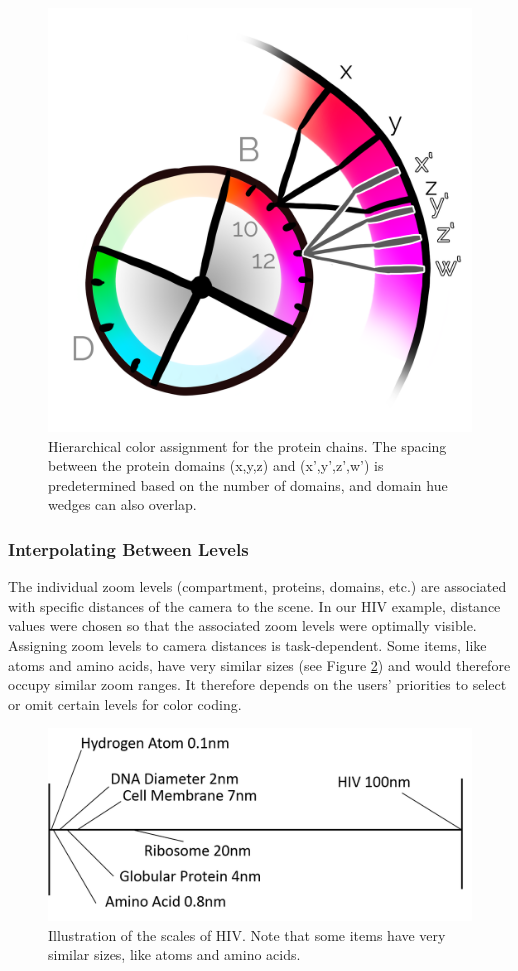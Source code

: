 \documentclass{egpubl}
\begin{document}
	
	\begin{figure}
		\centering
		\includegraphics[width=0.4\linewidth]{Figures/overlap}
		\caption{Hierarchical color assignment for the protein chains. 
			The spacing between the protein domains (x,y,z) and (x',y',z',w') is predetermined based on the number of domains, and domain hue wedges can also overlap. 
		}
		\label{fig:overlap}
	\end{figure}
	
	

	
	\subsubsection{Interpolating Between Levels}
	
	The individual zoom levels (compartment, proteins, domains, etc.) are associated with specific distances of the camera to the scene. 
	In our HIV example, distance values were chosen so that the associated zoom levels were optimally visible. 
	Assigning zoom levels to camera distances is task-dependent. 
	Some items, like atoms and amino acids, have very similar sizes (see Figure \ref{fig:hivScale}) and would therefore occupy similar zoom ranges. 
	It therefore depends on the users' priorities to select or omit certain levels for color coding. 
	
	\begin{figure}
		\centering
		\includegraphics[width=0.7\linewidth]{Figures/hivscale}
		\caption{Illustration of the scales of HIV. Note that some items have very similar sizes, like atoms and amino acids. }
		\label{fig:hivScale}
	\end{figure}
	
\end{document}
